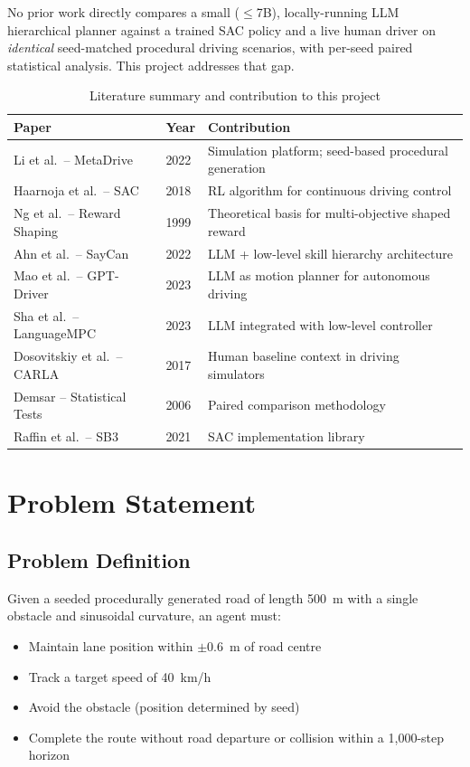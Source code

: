 \documentclass[12pt,a4paper]{report}
\begin{document}
No prior work directly compares a small ($\leq$7B), locally-running LLM hierarchical planner against a trained SAC policy and a live human driver on \textit{identical} seed-matched procedural driving scenarios, with per-seed paired statistical analysis. This project addresses that gap.

\begin{table}[H]
\centering
\caption{Literature summary and contribution to this project}
\label{tab:lit}
\begin{tabular}{p{4.5cm}p{1cm}p{7cm}}
\toprule
Paper & Year & Contribution \\
\midrule
Li et al.\ -- MetaDrive & 2022 & Simulation platform; seed-based procedural generation \\
Haarnoja et al.\ -- SAC & 2018 & RL algorithm for continuous driving control \\
Ng et al.\ -- Reward Shaping & 1999 & Theoretical basis for multi-objective shaped reward \\
Ahn et al.\ -- SayCan & 2022 & LLM + low-level skill hierarchy architecture \\
Mao et al.\ -- GPT-Driver & 2023 & LLM as motion planner for autonomous driving \\
Sha et al.\ -- LanguageMPC & 2023 & LLM integrated with low-level controller \\
Dosovitskiy et al.\ -- CARLA & 2017 & Human baseline context in driving simulators \\
Demsar -- Statistical Tests & 2006 & Paired comparison methodology \\
Raffin et al.\ -- SB3 & 2021 & SAC implementation library \\
\bottomrule
\end{tabular}
\end{table}

\chapter{Problem Statement}

\section{Problem Definition}

Given a seeded procedurally generated road of length 500~m with a single obstacle and sinusoidal curvature, an agent must:
\begin{itemize}
  \item Maintain lane position within $\pm 0.6$~m of road centre
  \item Track a target speed of 40~km/h
  \item Avoid the obstacle (position determined by seed)
  \item Complete the route without road departure or collision within a 1,000-step horizon
\end{itemize}
\end{document}

